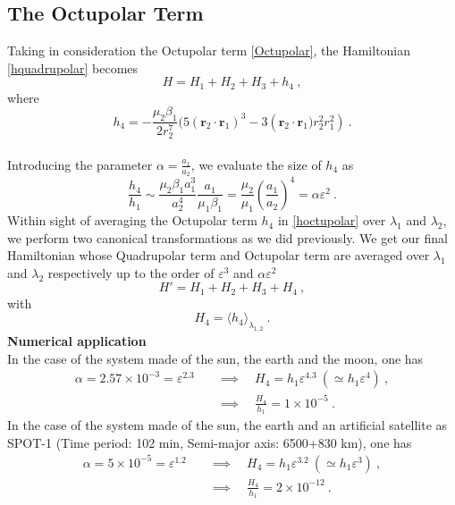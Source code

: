 \documentclass[a4paper]{article}
\begin{document}
\subsection{The Octupolar Term}
\label{octu}
Taking in consideration the Octupolar term \eqref{Octupolar}, the Hamiltonian \eqref{hquadrupolar} becomes
\begin{equation}
H=H_{1}+H_{2}+H_{3}+h_{4} \ ,
\label{hoctupolar}
\end{equation}
where \[h_{4}=-\frac{\mu_{2}\beta_{1}}{2r_{2}^{7}}(5(\mathbf r_{2}\cdot \mathbf r_{1})^3-3(\mathbf r_{2}\cdot {\mathbf r_{1})r_{2}^{2}r_{1}^{2}}) \ . \] \\
Introducing the parameter $\alpha=\frac{a_{1}}{a_{2}}$, we evaluate the size of $h_{4}$ as
\begin{equation}
\frac{h_{4}}{h_{1}} \sim \frac{\mu_{2}\beta_{1}a_{1}^{3}}{a_{2}^{4}} \frac{a_{1}}{\mu_{1}\beta_{1}}
=\frac{\mu_{2}}{\mu_{1}} \left(\frac{a_{1}}{a_{2}}\right)^{4}
=\alpha\varepsilon^{2} \ .
\end{equation}
Within sight of averaging the Octupolar term $h_{4}$ in \eqref{hoctupolar} over $\lambda_{1}$ and $\lambda_{2}$, we perform two canonical transformations as we did previously.
We get our final Hamiltonian whose Quadrupolar term and Octupolar term are averaged over $\lambda_{1}$ and $\lambda_{2}$ respectively up to the order of $\varepsilon^{3}$ and $\alpha\varepsilon^{2}$
\begin{equation}
H'=H_{1}+H_{2}+H_{3}+H_{4} \ ,
\end{equation}
with
\begin{equation}
H_{4}=\langle h_{4} \rangle _{\lambda_{1,2}}  \ .
\end{equation}
\textbf{Numerical application} \\
In the case of the system made of the sun, the earth and the moon, one has 
\begin{align}
\alpha=2.57 \times 10^{-3}=\varepsilon^{2.3} \quad &\implies \quad H_{4}=h_{1}\varepsilon^{4.3} \ (\simeq h_{1}\varepsilon^{4}) \ , \\
&\implies \quad \frac{H_{4}}{h_{1}}=1 \times 10^{-5} \ . 
\end{align}
In the case of the system made of the sun, the earth and an artificial satellite as SPOT-1 (Time period: 102 min, Semi-major axis: 6500+830 km), one has
\begin{align}
\alpha=5 \times 10^{-5}=\varepsilon^{1.2} \quad &\implies \quad H_{4}=h_{1}\varepsilon^{3.2} \ (\simeq h_{1}\varepsilon^{3}) \ , \\
&\implies \quad \frac{H_{4}}{h_{1}}=2 \times 10^{-12} \ . 
\label{sath3h4}
\end{align}
\end{document}
